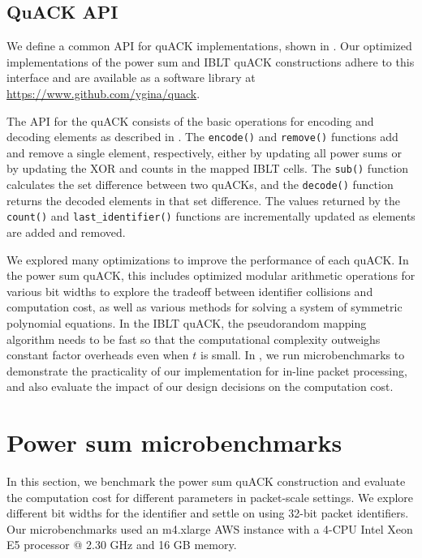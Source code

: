 \subsection{QuACK API}



We define a common API for quACK implementations, shown in
. Our optimized implementations of the power sum and
IBLT quACK constructions adhere to this interface and are available as a
software library at \url{https://www.github.com/ygina/quack}.

The API for the quACK consists of the basic operations for encoding and
decoding elements as described in . The
\texttt{encode()} and \texttt{remove()} functions add and remove a single
element, respectively, either by updating all power sums or by updating the XOR
and counts in the mapped IBLT cells. The \texttt{sub()} function calculates the
set difference between two quACKs, and the \texttt{decode()} function returns
the decoded elements in that set difference. The values returned by the
\texttt{count()} and \texttt{last\_identifier()} functions are incrementally
updated as elements are added and removed.

We explored many optimizations to improve the performance of each quACK.
In the power sum quACK, this includes optimized modular arithmetic operations
for various bit widths to explore the tradeoff between identifier collisions
and computation cost, as well as various methods for solving a system of
symmetric polynomial equations. In the IBLT quACK, the pseudorandom mapping
algorithm needs to be fast so that the computational complexity outweighs
constant factor overheads even when $t$ is small.
In ,
we run microbenchmarks to demonstrate the practicality of our implementation
for in-line packet processing, and also evaluate the impact of our design
decisions on the computation cost.

\section{Power sum microbenchmarks}
\label{sec:quack:psum-microbenchmarks}



In this section, we benchmark the power sum quACK construction and evaluate the
computation cost for different parameters in packet-scale settings.
We explore different bit widths for the identifier and settle on
using 32-bit packet identifiers.
Our microbenchmarks used an m4.xlarge AWS instance with a 4-CPU Intel Xeon E5
processor @ 2.30 GHz and 16 GB memory.

